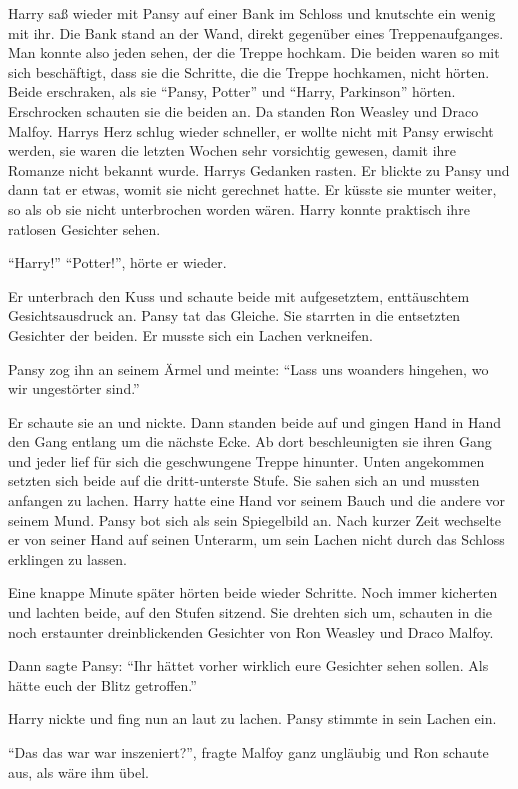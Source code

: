 Harry saß wieder mit Pansy auf einer Bank im Schloss und knutschte ein wenig mit ihr. Die Bank stand an der Wand, direkt gegenüber eines Treppenaufganges. Man konnte also jeden sehen, der die Treppe hochkam. Die beiden waren so mit sich beschäftigt, dass sie die Schritte, die die Treppe hochkamen, nicht hörten. Beide erschraken, als sie \enquote{Pansy, Potter} und \enquote{Harry, Parkinson} hörten. Erschrocken schauten sie die beiden an. Da standen Ron Weasley und Draco Malfoy. Harrys Herz schlug wieder schneller, er wollte nicht mit Pansy erwischt werden, sie waren die letzten Wochen sehr vorsichtig gewesen, damit ihre Romanze nicht bekannt wurde. Harrys Gedanken rasten. Er blickte zu Pansy und dann tat er etwas, womit sie nicht gerechnet hatte. Er küsste sie munter weiter, so als ob sie nicht unterbrochen worden wären. Harry konnte praktisch ihre ratlosen Gesichter sehen.

\enquote{Harry!} \enquote{Potter!}, hörte er wieder.

Er unterbrach den Kuss und schaute beide mit aufgesetztem, enttäuschtem Gesichtsausdruck an. Pansy tat das Gleiche. Sie starrten in die entsetzten Gesichter der beiden. Er musste sich ein Lachen verkneifen.

Pansy zog ihn an seinem Ärmel und meinte: \enquote{Lass uns woanders hingehen, wo wir ungestörter sind.}

Er schaute sie an und nickte. Dann standen beide auf und gingen Hand in Hand den Gang entlang um die nächste Ecke. Ab dort beschleunigten sie ihren Gang und jeder lief für sich die geschwungene Treppe hinunter. Unten angekommen setzten sich beide auf die dritt-unterste Stufe. Sie sahen sich an und mussten anfangen zu lachen. Harry hatte eine Hand vor seinem Bauch und die andere vor seinem Mund. Pansy bot sich als sein Spiegelbild an. Nach kurzer Zeit wechselte er von seiner Hand auf seinen Unterarm, um sein Lachen nicht durch das Schloss erklingen zu lassen.

Eine knappe Minute später hörten beide wieder Schritte. Noch immer kicherten und lachten beide, auf den Stufen sitzend. Sie drehten sich um, schauten in die noch erstaunter dreinblickenden Gesichter von Ron Weasley und Draco Malfoy.

Dann sagte Pansy: \enquote{Ihr hättet vorher wirklich eure Gesichter sehen sollen. Als hätte euch der Blitz getroffen.}

Harry nickte und fing nun an laut zu lachen. Pansy stimmte in sein Lachen ein.

\enquote{Das \gst das war \gst war inszeniert?}, fragte Malfoy ganz ungläubig und Ron schaute aus, als wäre ihm übel.

